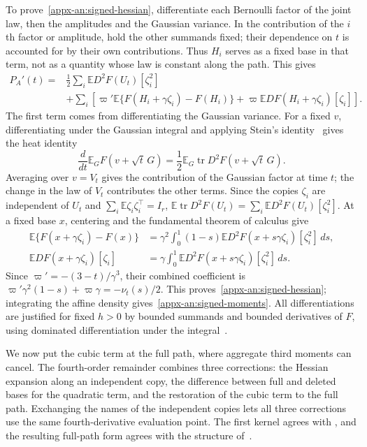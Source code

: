 \documentclass[11pt,letterpaper]{article}
\theoremstyle{remark}
\newcommand{\E}{\mathbb E}
\newcommand{\tr}{\operatorname{tr}}
\newcommand{\dd}{\,d}
\begin{document}
To prove~\eqref{appx-an:signed-hessian}, differentiate each Bernoulli
factor of the joint law, then the amplitudes and the Gaussian variance.
In the contribution of the \(i\)th factor or amplitude, hold the other
summands fixed; their dependence on \(t\) is accounted for by their
own contributions. Thus \(H_i\) serves as a fixed base in that term,
not as a quantity whose law is constant along the path. This gives
\begin{align*}
 P_A'(t)
 ={}&\frac12\sum_i\E D^2F(U_t)[\zeta_i^2]\\
 &+\sum_i\left[\varpi'\E\{F(H_i+\gamma\zeta_i)-F(H_i)\}
             +\varpi\E DF(H_i+\gamma\zeta_i)[\zeta_i]\right].
\end{align*}
The first term comes from differentiating the Gaussian variance.
For a fixed \(v\), differentiating under the Gaussian integral and
applying Stein's identity~\cite{Stein1981} gives the heat identity
\[
 \frac{d}{dt}\E_G F(v+\sqrt t\,G)
 =\frac12\E_G\tr D^2F(v+\sqrt t\,G).
\]
Averaging over \(v=V_t\) gives the contribution of the Gaussian
factor at time \(t\); the change in the law of \(V_t\) contributes
the other terms. Since the copies \(\zeta_i\) are independent of
\(U_t\) and \(\sum_i\E\zeta_i\zeta_i^\top=I_r\),
\(\E\tr D^2F(U_t)=\sum_i\E D^2F(U_t)[\zeta_i^2]\).
At a fixed base \(x\), centering and the fundamental theorem of calculus give
\begin{align*}
 \E\{F(x+\gamma\zeta_i)-F(x)\}
 &=\gamma^2\int_0^1(1-s)
       \E D^2F(x+s\gamma\zeta_i)[\zeta_i^2]\dd s,\\
 \E DF(x+\gamma\zeta_i)[\zeta_i]
 &=\gamma\int_0^1\E D^2F(x+s\gamma\zeta_i)[\zeta_i^2]\dd s.
\end{align*}
Since \(\varpi'=-(3-t)/\gamma^3\), their combined coefficient
is \(\varpi'\gamma^2(1-s)+\varpi\gamma=-\nu_t(s)/2\).
This proves~\eqref{appx-an:signed-hessian}; integrating the affine
density gives~\eqref{appx-an:signed-moments}. All differentiations
are justified for fixed \(h>0\) by bounded summands and bounded
derivatives of \(F\), using dominated differentiation under the
integral~\cite[Section~2.3]{Folland1999}.

We now put the cubic term at the full path, where aggregate third
moments can cancel. The fourth-order remainder combines three
corrections: the Hessian expansion along an independent copy, the
difference between full and deleted bases for the quadratic term, and
the restoration of the cubic term to the full path. Exchanging the
names of the independent copies lets all three corrections use the
same fourth-derivative evaluation point. The first kernel agrees with
\cite[Lemma~4.1]{AL}, and the resulting full-path form agrees with
the structure of~\cite[Lemma~22]{GaoZhang}.
\end{document}
